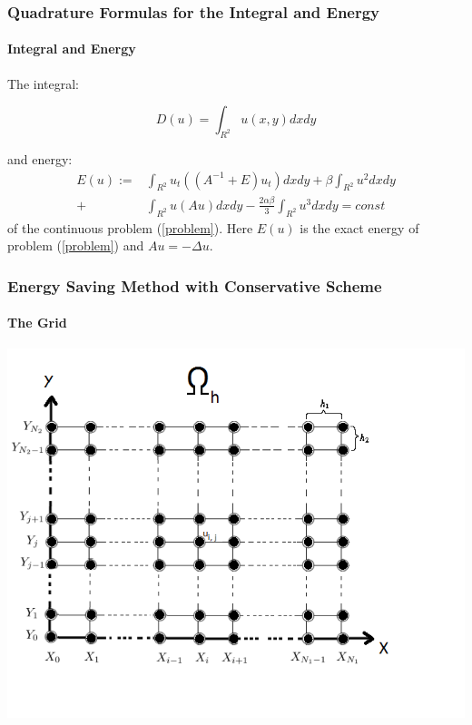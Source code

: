\documentclass{beamer}
\newcommand{\rf}[1]{(\ref{#1})}
\begin{document}
\begin{frame}
\frametitle{Quadrature Formulas for the Integral and Energy}
\framesubtitle{Integral and Energy}
The integral:

\begin{equation}\label{int}
D(u)=\int_{R^2} u(x,y)dx dy
\end{equation}

and energy:
\begin{align}\label{ex-en}
E(u):=&\int_{R^2} u_t \left((A^{-1}+E)u_t\right) dxdy+
\beta \int_{R^2} u^2 dxdy \nonumber\\
+& \int_{R^2}u \left(A u\right) dxdy
-\frac{2 \alpha \beta}{3} \int_{R^2} u^3 dxdy =const
\end{align}
of the continuous problem \rf{problem}. Here $E(u)$ is the exact energy of problem \rf{problem} and $Au=-\Delta u$.
\end{frame}


\begin{frame}
\frametitle{Energy Saving Method with Conservative Scheme}
\framesubtitle{The Grid}

\begin{center}\vspace{0.4cm}
	\begin{minipage}[b]{0.6\linewidth}
		\includegraphics[width=\linewidth]{Omega_dah.png}
	\end{minipage}
\end{center}

\end{frame}
\end{document}
